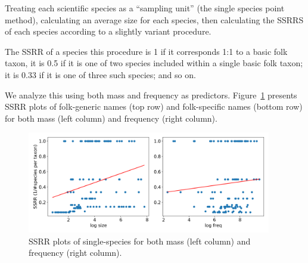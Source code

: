 \documentclass[10pt,letterpaper]{article}
\begin{document}

Treating each scientific species as a ``sampling unit'' (the single species point method), calculating an average size for each species, then calculating the SSRRS of each species according to a slightly variant procedure.

The SSRR of a species this procedure is 1 if it corresponds 1:1 to a basic folk taxon, it is 0.5 if it is one of two species included within a single basic folk taxon; it is 0.33 if it is one of three such species; and so on.

We analyze this using both mass and frequency as predictors. Figure~\ref{fig-ssrr} presents SSRR plots of folk-generic names (top row) and folk-specific names (bottom row) for both mass (left column) and frequency (right column).

\begin{figure}[t!]
  \begin{center}
    \includegraphics[width=0.95\textwidth]{./figures/ssrr-singlespecies.png}
        \caption{SSRR plots of single-species for both mass (left column) and frequency (right column).}
        \label{fig-ssrr}
  \end{center}
\end{figure}
\end{document}
